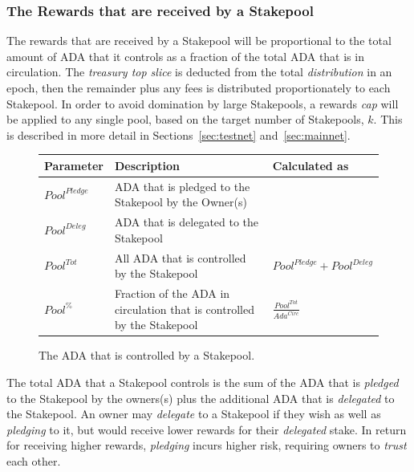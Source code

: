 \documentclass[11pt,a4paper,dvipsnames,twosided,final]{article}
\newcommand{\khcomment}[1]{\todo[color=blue!20]{KH: #1}}
\newcommand{\ada}{ADA{}}
\begin{document}
\subsubsection*{The Rewards that are received by a Stakepool}

The rewards that are received by a Stakepool will be proportional to the total amount of \ada{} that it controls
as a fraction of the total \ada{} that is in circulation.  The \emph{treasury top slice} is deducted from the total \emph{distribution}
in an epoch, then the remainder plus any fees is distributed proportionately to each Stakepool.  In order to avoid domination by large Stakepools,
a rewards \emph{cap} will be applied to any single pool, based on the target number of Stakepools, $k$.
This is described in more detail in Sections~\ref{sec:testnet} and~\ref{sec:mainnet}.
\khcomment{Check: fees before or after cap?}

\begin{figure}[h!]
\begin{center}
\begin{tabular}{||l|p{9cm}|l||}
  \hline \hline
\textbf{Parameter} & \textbf{Description} & \textbf{Calculated as} \\\hline
{\color{red} ${\textit{Pool}}^\textit{Pledge}$} & {\color{red} \ada{} that is pledged to the Stakepool by the Owner(s)} & \\\hline
{\color{blue} ${\textit{Pool}}^\textit{Deleg}$} & {\color{blue}  \ada{} that is delegated to the Stakepool} & \\\hline
${\textit{Pool}}^{Tot}$ & All \ada{} that is controlled by the Stakepool & ${\textit{Pool}}^\textit{Pledge} + {\textit{Pool}}^\textit{Deleg}$ \\\hline
${\textit{Pool}}^\%$ & Fraction of the \ada{} in circulation that is controlled by the Stakepool & {\large $\frac{{\textit{Pool}}^{Tot}}{\textit{Ada}^{\textit{Circ}}}$} \\\hline
  \hline
\end{tabular}
\end{center}
\caption{The \ada{} that is controlled by a Stakepool.}
\end{figure}

\noindent
The total \ada{} that a Stakepool controls is the sum of the \ada{} that is \emph{pledged} to the Stakepool by the owners(s) plus
the additional \ada{} that is \emph{delegated} to the Stakepool.  An owner may \emph{delegate} to a Stakepool if
they wish as well as \emph{pledging} to it, but would receive lower rewards for their \emph{delegated} stake.
In return for receiving higher rewards, \emph{pledging} incurs higher risk, requiring owners to \emph{trust} each other.
\end{document}

